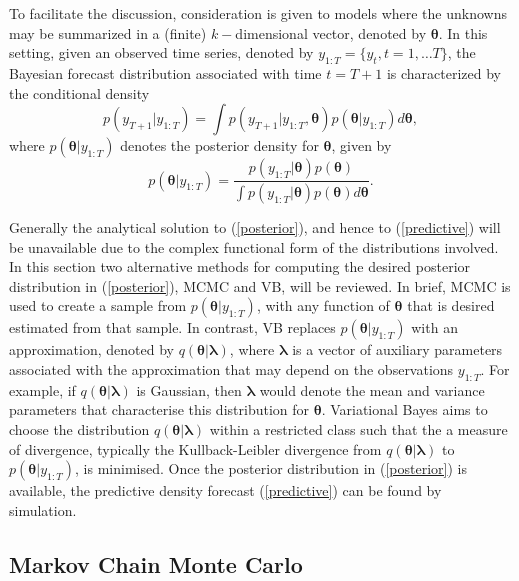 \documentclass[12pt,a4paper]{article}%
\numberwithin{equation}{section}
\begin{document}
To facilitate the discussion, consideration is given to models where the unknowns may be summarized in a (finite) $k-$dimensional vector, denoted by $\boldsymbol{\theta}.$ In this setting, given an observed time series, denoted by $y_{1:T}= \{y_{t}, t = 1, \dots T\}$, the Bayesian forecast distribution associated with time $t=T+1$ is characterized by the conditional density
\begin{equation}
\label{predictive}
p(y_{T+1} | y_{1:T}) =\int p(y_{T+1}|y_{1:T},\boldsymbol{\theta}) p(\boldsymbol{\theta}|y_{1:T}) d\boldsymbol{\theta},
\end{equation}
where $p(\boldsymbol{\theta}|y_{1:T})$ denotes the posterior density for $\boldsymbol{\theta}$, given by
\begin{equation}
\label{posterior}
 p(\boldsymbol{\theta} | y_{1:T}) = \frac{p(y_{1:T}|\boldsymbol{\theta})p(\boldsymbol{\theta})}{\int p(y_{1:T}|\boldsymbol{\theta})p(\boldsymbol{\theta}) d\boldsymbol{\theta}}.
\end{equation}

Generally the analytical solution to (\ref{posterior}), and hence to (\ref{predictive}) will be unavailable due to the complex functional form of the distributions involved. 
In this section two alternative methods for computing the desired posterior distribution in (\ref{posterior}),  MCMC and VB, will be reviewed.
In brief, MCMC is used to create a sample from $p(\boldsymbol{\theta} | y_{1:T})$, with any function of $\boldsymbol{\theta}$ that is desired estimated from that sample. In contrast, VB replaces $p(\boldsymbol{\theta} | y_{1:T})$ with an approximation, denoted by $q(\boldsymbol{\theta} | \boldsymbol{\lambda})$, where $\boldsymbol{\lambda}$ is a vector of auxiliary parameters associated with the approximation that may depend on the observations $y_{1:T}$.
For example, if $q(\boldsymbol{\theta} | \boldsymbol{\lambda})$ is Gaussian, then $\boldsymbol{\lambda}$ would denote the mean and variance parameters that characterise this distribution for $\boldsymbol{\theta}$.  Variational Bayes aims to choose the distribution $q(\boldsymbol{\theta} | \boldsymbol{\lambda})$ within a restricted class such that the a measure of divergence, typically the Kullback-Leibler divergence from $q(\boldsymbol{\theta} | \boldsymbol{\lambda})$ to $p(\boldsymbol{\theta} | y_{1:T})$, is minimised. Once the posterior distribution in (\ref{posterior}) is available, the predictive density forecast (\ref{predictive}) can be found by simulation.

\subsection{Markov Chain Monte Carlo} \label{sec:MCMC}
\end{document}
